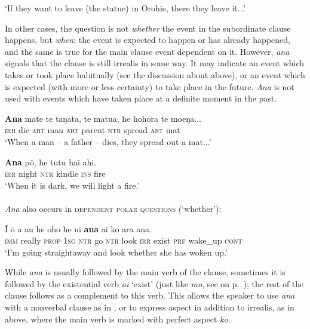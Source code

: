 \glt
‘If they want to leave (the statue) in Orohie, there they leave it...’ \textstyleExampleref{[Ley-4-06.015]}
\z

In other cases, the question is not \textit{whether} the event in the subordinate clause happens, but \textit{when}: the event is expected to happen or has already happened, and the same is true for the main clause event dependent on it. However, \textit{ana} signals that the clause is still irrealis in some way. It may indicate an event which takes or took place habitually (see the discussion about  above), or an event which is expected (with more or less certainty) to take place in the future. \textit{Ana} is not used with events which have taken place at a definite moment in the past. 

\ea\label{ex:11.182}
\gll \textbf{Ana} mate te taŋata, te matu{\ꞌ}a, he hohora te moeŋa... \\
\textsc{irr} die \textsc{art} man \textsc{art} parent \textsc{ntr} spread \textsc{art} mat \\

\glt 
‘When a man – a father – dies, they spread out a mat...’ \textstyleExampleref{[Ley-4-08.001]}
\z

\ea\label{ex:11.183}
\gll \textbf{Ana} pō, he tutu hai ahi. \\
\textsc{irr} night \textsc{ntr} kindle \textsc{ins} fire \\

\glt 
‘When it is dark, we will light a fire.’ \textstyleExampleref{[R210.085]} 
\z

\paragraph{} \textit{Ana} also occurs in \textsc{dependent polar questions} (‘whether’):

\ea\label{ex:11.184}
\gll {\ꞌ}Ī {\ꞌ}ō a au he oho he u{\ꞌ}i \textbf{ana} ai ko {\ꞌ}ara {\ꞌ}ana. \\
\textsc{imm} really \textsc{prop} \textsc{1sg} \textsc{ntr} go \textsc{ntr} look \textsc{irr} exist \textsc{prf} wake\_up \textsc{cont} \\

\glt 
‘I’m going straightaway and look whether she has woken up.’ \textstyleExampleref{[R229.366]} 
\z

While \textit{ana} is usually followed by the main verb of the clause, sometimes it is followed by the existential verb \textit{ai} ‘exist’ (just like \textit{mo}, see  on p.~\pageref{ex:11.146}); the rest of the clause follows as a complement to this verb. This allows the speaker to use \textit{ana} with a nonverbal clause as in , or to express aspect in addition to irrealis, as in  above, where the main verb is marked with perfect aspect \textit{ko}. 

